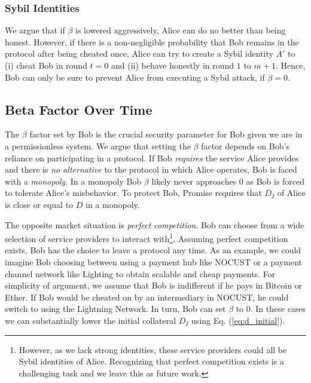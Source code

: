\documentclass[runningheads]{llncs}
\newcommand{\sys}{Promise\xspace}
\begin{document}
\subsubsection{Sybil Identities}
We argue that if $\beta$ is lowered aggressively, Alice can do no better than being honest.
However, if there is a non-negligible probability that Bob remains in the protocol after being cheated once, Alice can try to create a Sybil identity $A'$ to (i) cheat Bob in round $t=0$ and (ii) behave honestly in round $1$ to $m+1$.
Hence, Bob can only be sure to prevent Alice from executing a Sybil attack, if $\beta = 0$.

\subsection{Beta Factor Over Time}
The $\beta$ factor set by Bob is the crucial security parameter for Bob given we are in a permissionless system.
We argue that setting the $\beta$ factor depends on Bob's reliance on participating in a protocol.
If Bob \emph{requires} the service Alice provides and there is \emph{no alternative} to the protocol in which Alice operates, Bob is faced with a \emph{monopoly}.
In a monopoly Bob $\beta$ likely never approaches 0 as Bob is forced to tolerate Alice's misbehavior.
To protect Bob, \sys requires that $D_I$ of Alice is close or equal to $D$ in a monopoly.

The opposite market situation is \emph{perfect competition}.
Bob can choose from a wide selection of service providers to interact with\footnote{
However, as we lack strong identities, these service providers could all be Sybil identities of Alice.
Recognizing that perfect competition exists is a challenging task and we leave this as future work.}.
Assuming perfect competition exists, Bob has the choice to leave a protocol any time.
As an example, we could imagine Bob choosing between using a payment hub like NOCUST or a payment channel network like Lighting to obtain scalable and cheap payments.
For simplicity of argument, we assume that Bob is indifferent if he pays in Bitcoin or Ether.
If Bob would be cheated on by an intermediary in NOCUST, he could switch to using the Lightning Network.
In turn, Bob can set $\beta$ to 0.
In these cases we can substantially lower the initial collateral $D_I$ using Eq. (\ref{eq:d_initial}).
\end{document}

